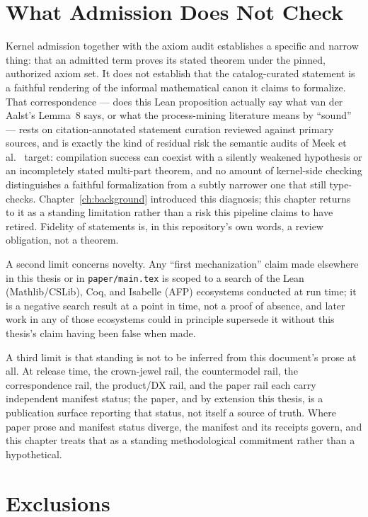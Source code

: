 \section{What Admission Does Not Check}
\label{sec:disc-admission-limits}

Kernel admission together with the axiom audit establishes a specific
and narrow thing: that an admitted term proves its stated theorem under
the pinned, authorized axiom set. It does not establish that the
catalog-curated statement is a faithful rendering of the informal
mathematical canon it claims to formalize. That correspondence --- does
this Lean proposition actually say what van der Aalst's Lemma~8 says, or
what the process-mining literature means by ``sound'' --- rests on
citation-annotated statement curation reviewed against primary sources,
and is exactly the kind of residual risk the semantic audits of Meek et
al.~\cite{meek2026formalizing} target: compilation success can coexist
with a silently weakened hypothesis or an incompletely stated multi-part
theorem, and no amount of kernel-side checking distinguishes a faithful
formalization from a subtly narrower one that still type-checks.
Chapter~\ref{ch:background} introduced this diagnosis; this chapter
returns to it as a standing limitation rather than a risk this pipeline
claims to have retired. Fidelity of statements is, in this repository's
own words, a review obligation, not a theorem.

A second limit concerns novelty. Any ``first mechanization'' claim made
elsewhere in this thesis or in \texttt{paper/main.tex} is scoped to a
search of the Lean (Mathlib/CSLib), Coq, and Isabelle (AFP) ecosystems
conducted at run time; it is a negative search result at a point in time,
not a proof of absence, and later work in any of those ecosystems could
in principle supersede it without this thesis's claim having been false
when made.

A third limit is that standing is not to be inferred from this document's
prose at all. At release time, the crown-jewel rail, the countermodel
rail, the correspondence rail, the product/DX rail, and the paper rail
each carry independent manifest status; the paper, and by extension this
thesis, is a publication surface reporting that status, not itself a
source of truth. Where paper prose and manifest status diverge, the
manifest and its receipts govern, and this chapter treats that as a
standing methodological commitment rather than a hypothetical.

\section{Exclusions}
\label{sec:disc-exclusions}

